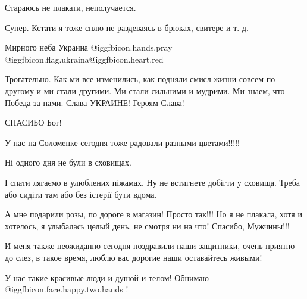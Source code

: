 \begin{itemize}
Стараюсь не плакати, неполучается.

Супер. Кстати я тоже сплю не раздеваясь в брюках, свитере и т. д.

Мирного неба Украина @igg{fbicon.hands.pray} @igg{fbicon.flag.ukraina}@igg{fbicon.heart.red}


Трогательно. Как ми все изменились, как подняли смисл жизни совсем по другому и
ми стали другими. Ми стали сильними и мудрими. Ми знаем, что Победа за нами.
Слава УКРАИНЕ! Героям Слава!


СПАСИБО Бог!

У нас на Соломенке сегодня тоже радовали разными цветами!!!!!

Ні одного дня не були в сховищах.

І спати лягаємо в улюблених піжамах. Ну не встигнете добігти у сховища. Треба
або сидіти там або без істерії бути вдома.


А мне подарили розы, по дороге в магазин! Просто так!!! Но я не плакала, хотя и
хотелось, я улыбалась целый день, не смотря ни на что! Спасибо, Мужчины!!!


И меня также неожиданно сегодня поздравили наши защитники, очень приятно до
слез, в такое время, люблю вас дорогие наши оставайтесь живыми!

У нас такие красивые люди и душой и телом! Обнимаю  @igg{fbicon.face.happy.two.hands} !

\end{itemize} %
